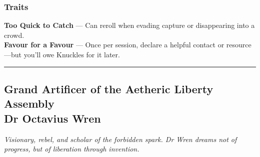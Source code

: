 \begin{paracol}{3}
        \subsubsection{Traits}
            \textbf{Too Quick to Catch} — Can reroll when evading capture or disappearing into a crowd.\\
            \noindent\textbf{Favour for a Favour} — Once per session, declare a helpful contact or resource—but you’ll owe Knuckles for it later.
    \end{paracol}
    \vspace{.5\baselineskip}
    \hrule
    \vspace{.5\baselineskip}

    \subsection{{\small Grand Artificer of the Aetheric Liberty Assembly}\\ Dr Octavius Wren}
\label{npc:octavius-wren}

    \emph{Visionary, rebel, and scholar of the forbidden spark. Dr Wren dreams not of progress, but of liberation through invention.}
    \vspace{.5\baselineskip}
  
